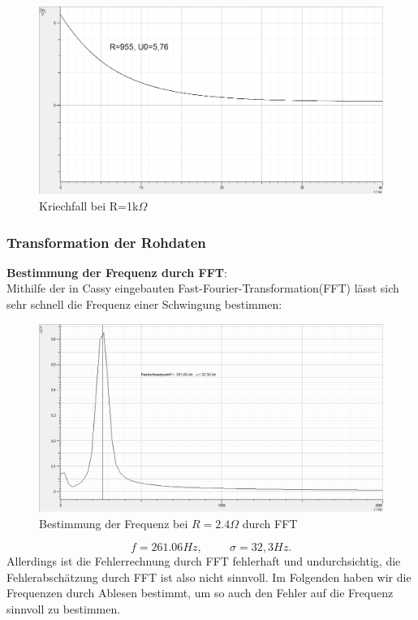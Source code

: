 \documentclass[12pt,a4paper]{article}
\begin{document}
\begin{figure}[H]
\caption{Kriechfall bei R=1k$\Omega$}
\centering
\includegraphics[scale=0.3]{Bilder/Kriechfall1KOhm.png}
\end{figure}




\subsubsection{Transformation der Rohdaten}
\textbf{Bestimmung der Frequenz durch FFT}: \\
Mithilfe der in Cassy eingebauten Fast-Fourier-Transformation(FFT) lässt sich sehr schnell die Frequenz einer Schwingung bestimmen:

\begin{figure}[H]
\caption{Bestimmung der Frequenz bei $R=2.4\Omega$ durch FFT}
\centering
\includegraphics[scale=0.4]{Bilder/PEAK.png}
\end{figure}
\begin{equation}
f=261.06 Hz, \hspace{1cm} \sigma=32,3 Hz.
\end{equation}
Allerdings ist die Fehlerrechnung durch FFT fehlerhaft und undurchsichtig, die Fehlerabschätzung durch FFT ist also nicht sinnvoll. Im Folgenden haben wir die Frequenzen durch Ablesen bestimmt, um so auch den Fehler auf die Frequenz sinnvoll zu bestimmen.
\newline
\end{document}
